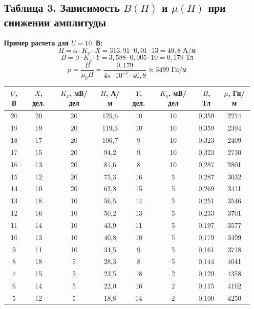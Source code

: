\subsection{Таблица 3. Зависимость $B(H)$ и $\mu(H)$ при снижении амплитуды}

\textbf{Пример расчета для $U=10$~В:}
\[
H = \alpha \cdot K_x \cdot X = 313{,}91 \cdot 0{,}01 \cdot 13 = 40{,}8 \text{ А/м}
\]
\[
B = \beta \cdot K_y \cdot Y = 3{,}588 \cdot 0{,}005 \cdot 10 = 0{,}179 \text{ Тл}
\]
\[
\mu = \frac{B}{\mu_0 H} = \frac{0{,}179}{4\pi \cdot 10^{-7} \cdot 40{,}8} \approx 3499 \text{ Гн/м}
\]

\begin{center}
\small
\begin{tabular}{|c|c|c|c|c|c|c|c|}
\hline
$U$, В & $X$, дел. & $K_x$, мВ/дел & $H$, А/м & $Y$, дел. & $K_y$, мВ/дел & $B$, Тл & $\mu$, Гн/м \\
\hline
20 & 20 & 20 & 125{,}6 & 10 & 10 & 0{,}359 & 2274 \\
\hline
19 & 19 & 20 & 119{,}3 & 10 & 10 & 0{,}359 & 2394 \\
\hline
18 & 17 & 20 & 106{,}7 & 9 & 10 & 0{,}323 & 2409 \\
\hline
17 & 15 & 20 & 94{,}2 & 9 & 10 & 0{,}323 & 2730 \\
\hline
16 & 13 & 20 & 81{,}6 & 8 & 10 & 0{,}287 & 2801 \\
\hline
15 & 12 & 20 & 75{,}3 & 16 & 5 & 0{,}287 & 3032 \\
\hline
14 & 10 & 20 & 62{,}8 & 15 & 5 & 0{,}269 & 3411 \\
\hline
13 & 18 & 10 & 56{,}5 & 14 & 5 & 0{,}251 & 3546 \\
\hline
12 & 16 & 10 & 50{,}2 & 13 & 5 & 0{,}233 & 3701 \\
\hline
11 & 14 & 10 & 43{,}9 & 11 & 5 & 0{,}197 & 3577 \\
\hline
10 & 13 & 10 & 40{,}8 & 10 & 5 & 0{,}179 & 3499 \\
\hline
9 & 11 & 10 & 34{,}5 & 9 & 5 & 0{,}161 & 3718 \\
\hline
8 & 18 & 5 & 28{,}3 & 8 & 5 & 0{,}144 & 4041 \\
\hline
7 & 15 & 5 & 23{,}5 & 18 & 2 & 0{,}129 & 4358 \\
\hline
6 & 14 & 5 & 22{,}0 & 16 & 2 & 0{,}115 & 4162 \\
\hline
5 & 12 & 5 & 18{,}8 & 14 & 2 & 0{,}100 & 4250 \\
\hline
\end{tabular}
\normalsize
\end{center}

